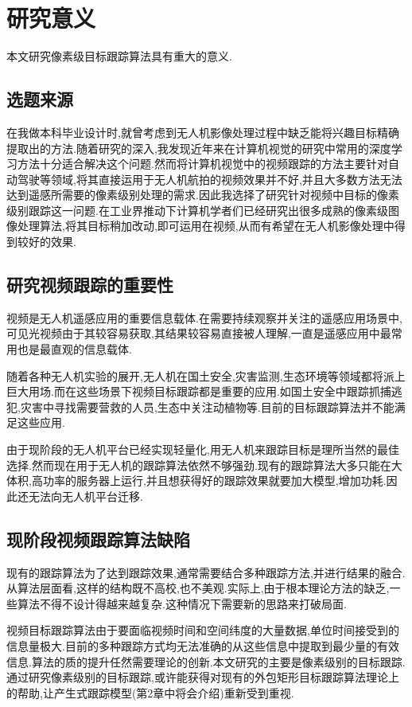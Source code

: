 \section{研究意义}
本文研究像素级目标跟踪算法具有重大的意义.
\subsection{选题来源}
在我做本科毕业设计\supercite{benchme}时,就曾考虑到无人机影像处理过程中缺乏能将兴趣目标精确提取出的方法.随着研究的深入,我发现近年来在计算机视觉的研究中常用的深度学习方法十分适合解决这个问题.然而将计算机视觉中的视频跟踪的方法主要针对自动驾驶等领域,将其直接运用于无人机航拍的视频效果并不好,并且大多数方法无法达到遥感所需要的像素级别处理的需求.因此我选择了研究针对视频中目标的像素级别跟踪这一问题.在工业界推动下计算机学者们已经研究出很多成熟的像素级图像处理算法,将其目标稍加改动,即可运用在视频,从而有希望在无人机影像处理中得到较好的效果.

\subsection{研究视频跟踪的重要性}
视频是无人机遥感应用的重要信息载体.在需要持续观察并关注的遥感应用场景中,可见光视频由于其较容易获取,其结果较容易直接被人理解,一直是遥感应用中最常用也是最直观的信息载体.
\par
随着各种无人机实验的展开,无人机在国土安全,灾害监测,生态环境等领域都将派上巨大用场.而在这些场景下视频目标跟踪都是重要的应用.如国土安全中跟踪抓捕逃犯,灾害中寻找需要营救的人员,生态中关注动植物等.目前的目标跟踪算法并不能满足这些应用.
\par
由于现阶段的无人机平台已经实现轻量化,用无人机来跟踪目标是理所当然的最佳选择.然而现在用于无人机的跟踪算法依然不够强劲.现有的跟踪算法大多只能在大体积,高功率的服务器上运行,并且想获得好的跟踪效果就要加大模型,增加功耗.因此还无法向无人机平台迁移.

\subsection{现阶段视频跟踪算法缺陷}
现有的跟踪算法为了达到跟踪效果,通常需要结合多种跟踪方法,并进行结果的融合.从算法层面看,这样的结构既不高校,也不美观.实际上,由于根本理论方法的缺乏,一些算法不得不设计得越来越复杂.这种情况下需要新的思路来打破局面.
\par
视频目标跟踪算法由于要面临视频时间和空间纬度的大量数据,单位时间接受到的信息量极大.目前的多种跟踪方式均无法准确的从这些信息中提取到最少量的有效信息.算法的质的提升任然需要理论的创新.本文研究的主要是像素级别的目标跟踪.通过研究像素级别的目标跟踪,或许能获得对现有的外包矩形目标跟踪算法理论上的帮助,让产生式跟踪模型(第2章中将会介绍)重新受到重视.

